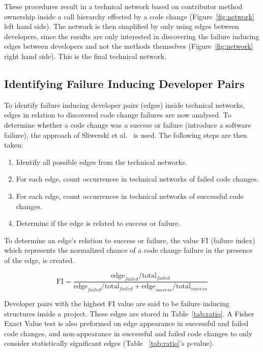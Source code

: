 \documentclass[conference]{IEEEtran}
\begin{document}
These procedures result in a technical network based on contributor method ownership 
inside a call hierarchy effected by a code change (Figure~\ref{fig:network} left hand side).
The network is then simplified by only using edges between developers, since the results
are only interested in discovering the failure inducing edges between developers and not the 
methods themselves (Figure~\ref{fig:network} right hand side). This is the final technical 
network.

\subsection{Identifying Failure Inducing Developer Pairs}
To identify failure inducing developer pairs (edges) inside technical networks, 
edges in relation to discovered code change failures are now analysed. To determine whether a code change 
was a success or failure (introduce a software failure), the approach of
Sliwerski et al.~\cite{Sliwerski:2005:CIF} is used. The following steps are then taken:

\begin{enumerate}
\item Identify all possible edges from the technical networks.
\item For each edge, count occurrences in technical networks of failed code changes.
\item For each edge, count occurrences in technical networks of successful code changes.
\item Determine if the edge is related to success or failure.
\end{enumerate}

To determine an edge's relation to success or failure,  the value FI (failure
index) which represents the normalized chance of a code change failure in the presence
of the edge, is created. 

\begin{equation}
\text{FI} = \frac{ \text{edge}_{failed} / \text{total}_{failed}}{\text{edge}_{failed} / \text{total}_{failed} + \text{edge}_{success} / \text{total}_{success}}
\end{equation}

Developer pairs with the highest FI value are said to be failure inducing structures
inside a project. These edges are stored in Table~\ref{tab:ratio}. A Fisher Exact Value test 
is also preformed on edge appearance in successful and failed
code changes, and non-appearance in successful and failed code changes to only
consider statistically significant edges (Table ~\ref{tab:ratio}'s p-value). 
\end{document}
